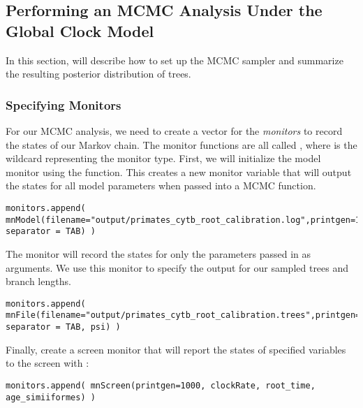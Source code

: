 \bigskip
\subsection{Performing an MCMC Analysis Under the Global Clock Model}

In this section, will describe how to set up the MCMC sampler and summarize the resulting posterior distribution of trees. 

\subsubsection{Specifying Monitors}

For our MCMC analysis, we need to create a vector for the \textit{monitors} to record the states of our Markov chain. 
The monitor functions are all called , where \cl{*} is the wildcard representing the monitor type.
First, we will initialize the model monitor using the  function. This creates a new monitor variable that will output the states for all model parameters when passed into a MCMC function. 
{\tt \begin{snugshade*}
\begin{lstlisting}
monitors.append( mnModel(filename="output/primates_cytb_root_calibration.log",printgen=10, separator = TAB) )
\end{lstlisting}
\end{snugshade*}}

The  monitor will record the states for only the parameters passed in as arguments. We use this monitor to specify the output for our sampled trees and branch lengths.

{\tt \begin{snugshade*}
\begin{lstlisting}
monitors.append( mnFile(filename="output/primates_cytb_root_calibration.trees",printgen=10, separator = TAB, psi) )
\end{lstlisting}
\end{snugshade*}}


Finally, create a screen monitor that will report the states of specified variables to the screen with :
{\tt \begin{snugshade*}
\begin{lstlisting}
monitors.append( mnScreen(printgen=1000, clockRate, root_time, age_simiiformes) )
\end{lstlisting}
\end{snugshade*}}

